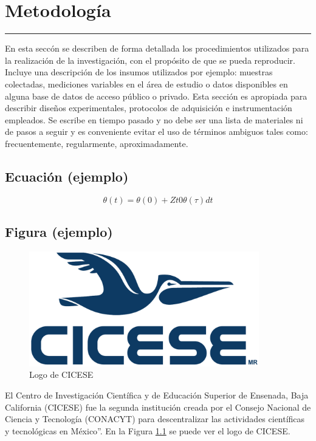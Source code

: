 \chapter{Metodolog\'ia}\label{capit:cap2}
\vspace{-2.0325ex}%
\noindent
\rule{\textwidth}{0.5pt}
\vspace{-5.5ex}%
\newcommand{\pushline}{\Indp}%

En esta secc\'on se describen de forma detallada los procedimientos utilizados para la realizaci\'on de la investigaci\'on, con el propósito de que se pueda reproducir. Incluye una descripci\'on de los insumos utilizados por ejemplo: muestras colectadas, mediciones variables en el \'area de estudio o datos disponibles en alguna base de datos de acceso p\'ublico o privado. Esta secci\'on es apropiada para describir diseños experimentales, protocolos de adquisici\'on e instrumentaci\'on empleados. Se escribe en tiempo pasado y no debe ser una lista de materiales ni de pasos a seguir y es conveniente evitar el uso de t\'erminos ambiguos tales como: frecuentemente, regularmente, aproximadamente.
\\

\section{Ecuaci\'on (ejemplo)}\label{secc:ejemploec}

\begin{equation}
\theta(t) = \theta(0) + Zt0 \theta(\tau)dt
\label{eq:ejem}
\end{equation}

\section{Figura (ejemplo)}\label{secc:ejemplofig}

\begin{figure}[h]
        \centering
        \includegraphics[width=100mm]{./Figures/logoCicese2009.pdf}
        \caption{Logo de CICESE} 
				\label{fig:ejemplo1}
\end{figure}

El Centro de Investigación Científica y de Educación Superior de Ensenada, Baja California (CICESE) fue la segunda institución creada por el Consejo Nacional de Ciencia y Tecnología (CONACYT) para descentralizar las actividades científicas y tecnológicas en México”. En la Figura \ref{fig:ejemplo1} se puede ver el logo de CICESE. 

\newpage
